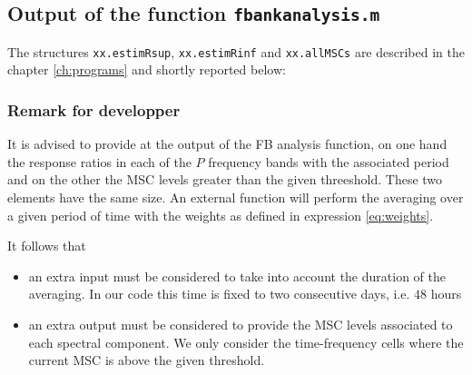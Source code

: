 \newpage\clearpage
\subsection{Output of the function {\tt fbankanalysis.m}}

{\small}

The structures {\tt xx.estimRsup}, {\tt xx.estimRinf} and {\tt xx.allMSCs}  are described in the chapter \ref{ch:programs} and shortly reported below:

  {\small }

\subsubsection{Remark for developper}

It is advised to provide at the output of the FB analysis function, on one hand the response ratios in each of the $P$ frequency bands  with the associated period and on the other the MSC levels greater than the given threeshold. These two elements have the same size. An external function will perform the averaging over a given period of time with the weights as defined in expression \ref{eq:weights}.

It follows that 
\begin{itemize}
\item
 an extra input must be considered to take into account the duration of the averaging. In our code this time is fixed to two consecutive days, i.e. $48$ hours
\item
 an extra output must be considered to provide the MSC levels associated to each spectral component. We only consider the time-frequency cells where the current MSC is above the given threshold.

\end{itemize}

